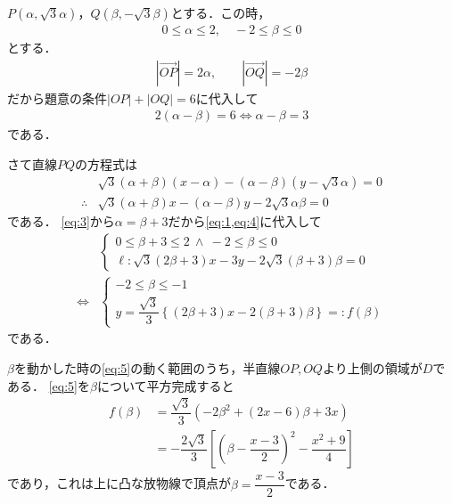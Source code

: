 \documentclass[../../main.tex]{subfiles}
\begin{document}
$P(\alpha,\sqrt{3}\alpha)$，$Q(\beta,-\sqrt{3}\beta)$とする．この時，
\begin{align}
  0\le\alpha\le2,\quad-2\le\beta\le0 \label{eq:1}
\end{align}
とする．
\begin{align}
  |\overrightarrow{OP}|=2\alpha,\qquad|\overrightarrow{OQ}|=-2\beta \label{eq:2}
\end{align}
だから題意の条件$|OP|+|OQ|=6$に代入して
\begin{align}
  2(\alpha-\beta)=6 \iff \alpha-\beta=3 \label{eq:3}
\end{align}
である．

さて直線$PQ$の方程式は
\begin{align}
  & \sqrt{3}(\alpha+\beta)(x-\alpha)-(\alpha-\beta)(y-\sqrt{3}\alpha)=0 \\
  \therefore
  & \sqrt{3}(\alpha+\beta)x-(\alpha-\beta)y-2\sqrt{3}\alpha\beta=0  \label{eq:4}
\end{align}
である．
\cref{eq:3}から$\alpha=\beta+3$だから\cref{eq:1,eq:4}に代入して
\begin{align}
  &
  \begin{cases}
    0\le\beta+3\le2\ \land\ -2\le\beta\le0 \\
    \ell:\sqrt{3}(2\beta+3)x-3y-2\sqrt{3}(\beta+3)\beta=0
  \end{cases} \\
  \iff
  &
  \begin{cases}
    -2\le\beta\le-1\\
    y=\dfrac{\sqrt{3}}{3}\left\{(2\beta+3)x-2(\beta+3)\beta\right\}=:f(\beta)
  \end{cases} \label{eq:5}
\end{align}
である．

$\beta$を動かした時の\cref{eq:5}の動く範囲のうち，半直線$OP,OQ$より上側の領域が$D$である．
\cref{eq:5}を$\beta$について平方完成すると
\begin{align}
  f(\beta)
  &=\dfrac{\sqrt{3}}{3}\left(-2\beta^2+(2x-6)\beta+3x\right)\\
  &=-\dfrac{2\sqrt{3}}{3}\left[\left(\beta-\dfrac{x-3}{2}\right)^2-\dfrac{x^2+9}{4}\right] \label{eq:6}
\end{align}
であり，これは上に凸な放物線で頂点が$\beta=\dfrac{x-3}{2}$である．
\end{document}

